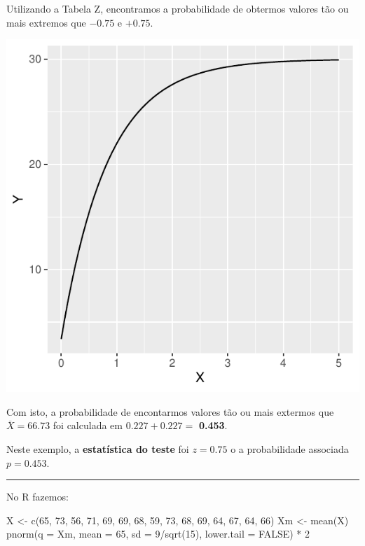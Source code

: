 \documentclass[
]{book}
\newenvironment{Shaded}{\begin{snugshade}}{\end{snugshade}}
\newcommand{\AttributeTok}[1]{\textcolor[rgb]{0.77,0.63,0.00}{#1}}
\newcommand{\ConstantTok}[1]{\textcolor[rgb]{0.00,0.00,0.00}{#1}}
\newcommand{\DecValTok}[1]{\textcolor[rgb]{0.00,0.00,0.81}{#1}}
\newcommand{\FunctionTok}[1]{\textcolor[rgb]{0.00,0.00,0.00}{#1}}
\newcommand{\NormalTok}[1]{#1}
\newcommand{\OtherTok}[1]{\textcolor[rgb]{0.56,0.35,0.01}{#1}}
\newcommand{\SpecialCharTok}[1]{\textcolor[rgb]{0.00,0.00,0.00}{#1}}
\begin{document}
Utilizando a Tabela Z, encontramos a probabilidade de obtermos valores tão ou mais extremos que \(-0.75\) e \(+0.75\).

\begin{center}\includegraphics{probest-cambientais_files/figure-latex/unnamed-chunk-130-1} \end{center}

Com isto, a probabilidade de encontarmos valores tão ou mais extermos que \(\overline{X} = 66.73\) foi calculada em \(0.227 + 0.227 =\) \textbf{0.453}.

Neste exemplo, a \textbf{estatística do teste} foi \(z = 0.75\) o a probabilidade associada \(p = 0.453\).

\begin{center}\rule{0.5\linewidth}{0.5pt}\end{center}

No R fazemos:

\begin{Shaded}
\begin{Highlighting}[]
\NormalTok{X }\OtherTok{\textless{}{-}} \FunctionTok{c}\NormalTok{(}\DecValTok{65}\NormalTok{, }\DecValTok{73}\NormalTok{, }\DecValTok{56}\NormalTok{, }\DecValTok{71}\NormalTok{, }\DecValTok{69}\NormalTok{, }\DecValTok{69}\NormalTok{, }\DecValTok{68}\NormalTok{, }\DecValTok{59}\NormalTok{, }\DecValTok{73}\NormalTok{, }\DecValTok{68}\NormalTok{, }\DecValTok{69}\NormalTok{, }\DecValTok{64}\NormalTok{, }\DecValTok{67}\NormalTok{, }\DecValTok{64}\NormalTok{, }\DecValTok{66}\NormalTok{)}
\NormalTok{Xm }\OtherTok{\textless{}{-}} \FunctionTok{mean}\NormalTok{(X)}
\FunctionTok{pnorm}\NormalTok{(}\AttributeTok{q =}\NormalTok{ Xm, }\AttributeTok{mean =} \DecValTok{65}\NormalTok{, }\AttributeTok{sd =} \DecValTok{9}\SpecialCharTok{/}\FunctionTok{sqrt}\NormalTok{(}\DecValTok{15}\NormalTok{), }\AttributeTok{lower.tail =} \ConstantTok{FALSE}\NormalTok{) }\SpecialCharTok{*} \DecValTok{2}
\end{Highlighting}
\end{Shaded}
\end{document}

